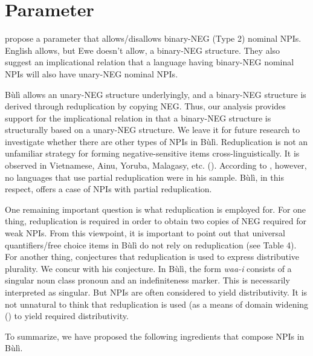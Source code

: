 \documentclass[output=paper,colorlinks,citecolor=brown]{langscibook}
\begin{document}
\z


\section{Parameter}

\cite{CollinsEtAl2017} propose a parameter that allows/disallows binary-NEG (Type 2) nominal NPIs. English allows, but Ewe doesn't allow, a binary-NEG structure. They also suggest an implicational relation that a language having binary-NEG nominal NPIs will also have unary-NEG nominal NPIs.

 Bùlì allows an unary-NEG structure underlyingly, and a binary-NEG structure is derived through reduplication by copying NEG. Thus, our analysis provides support for the implicational relation in that a binary-NEG structure is structurally based on a unary-NEG structure. We leave it for future research to investigate whether there are other types of NPIs in Bùlì.
Reduplication is not an unfamiliar strategy for forming negative-sensitive items cross-linguistically. It is observed in Vietnamese, Ainu, Yoruba, Malagasy, etc. (\citealt{Haspelmath1997}). According to \cite[179]{Haspelmath1997}, however, no languages that use partial reduplication were in his sample. Bùlì, in this respect, offers a case of NPIs with partial reduplication.

One remaining important question is what reduplication is employed for.  For one thing, reduplication is required in order to obtain two copies of NEG required for weak NPIs. From this viewpoint, it is important to point out that universal quantifiers/free choice items in Bùlì do not rely on reduplication (see Table 4). For another thing, \cite{Haspelmath1997} conjectures that reduplication is used to express distributive plurality. We concur with his conjecture. In Bùlì, the form \textit{waa-i} consists of a singular noun class pronoun and an indefiniteness marker. This is necessarily interpreted as singular. But NPIs are often considered to yield distributivity. It is not unnatural to think that reduplication is used (as a means of domain widening (\citealt{KadmonLandman1993}) to yield required distributivity.

To summarize, we have proposed the following ingredients that compose NPIs in Bùlì.
\end{document}
